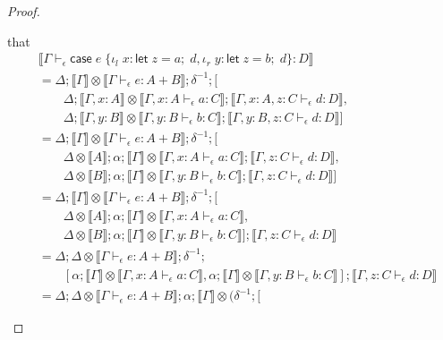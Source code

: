 \documentclass[acmsmall,screen,review]{acmart}
\newcommand{\ms}[1]{\ensuremath{\mathsf{#1}}}
\newcommand{\lto}{:}
\newcommand{\linl}[1]{\iota_l\;{#1}}
\newcommand{\linr}[1]{\iota_r\;{#1}}
\newcommand{\letexpr}[3]{\ensuremath{\ms{let}\;#1 = #2;\;#3}}
\newcommand{\caseexpr}[5]{\ms{case}\;#1\;\{\linl{#2} \lto #3, \linr{#4} \lto #5\}}
\newcommand{\bhyp}[2]{#1 : #2}
\newcommand{\hasty}[4]{#1 \vdash_{#2} #3: {#4}}
\newcommand{\dnt}[1]{\llbracket{#1}\rrbracket}
\begin{document}
\begin{proof}
\begin{itemize}[leftmargin=*]
    that
    \begin{align*}
      & \dnt{\hasty{\Gamma}{\epsilon}{\caseexpr{e}{x}{\letexpr{z}{a}{d}}{y}{\letexpr{z}{b}{d}}}{D}}
      \\ &= \Delta ; \dnt{\Gamma} \otimes \dnt{\hasty{\Gamma}{\epsilon}{e}{A + B}} ; \delta^{-1} ; [
      \\ & \qquad \Delta
            ; \dnt{\Gamma, \bhyp{x}{A}} \otimes \dnt{\hasty{\Gamma, \bhyp{x}{A}}{\epsilon}{a}{C}}
            ; \dnt{\hasty{\Gamma, \bhyp{x}{A}, \bhyp{z}{C}}{\epsilon}{d}{D}}
            ,
      \\  & \qquad \Delta
            ; \dnt{\Gamma, \bhyp{y}{B}} \otimes \dnt{\hasty{\Gamma, \bhyp{y}{B}}{\epsilon}{b}{C}}
            ; \dnt{\hasty{\Gamma, \bhyp{y}{B}, \bhyp{z}{C}}{\epsilon}{d}{D}}
        ]
      \\ &= \Delta ; \dnt{\Gamma} \otimes \dnt{\hasty{\Gamma}{\epsilon}{e}{A + B}} ; \delta^{-1} ; [
      \\ & \qquad \Delta \otimes \dnt{A} ; \alpha
            ; \dnt{\Gamma} \otimes \dnt{\hasty{\Gamma, \bhyp{x}{A}}{\epsilon}{a}{C}}
            ; \dnt{\hasty{\Gamma, \bhyp{z}{C}}{\epsilon}{d}{D}}
            ,
      \\  & \qquad \Delta \otimes \dnt{B} ; \alpha
            ; \dnt{\Gamma} \otimes \dnt{\hasty{\Gamma, \bhyp{y}{B}}{\epsilon}{b}{C}}
            ; \dnt{\hasty{\Gamma, \bhyp{z}{C}}{\epsilon}{d}{D}}
        ]
      \\ &= \Delta ; \dnt{\Gamma} \otimes \dnt{\hasty{\Gamma}{\epsilon}{e}{A + B}} ; \delta^{-1} ; [
      \\ & \qquad \Delta \otimes \dnt{A} ; \alpha
            ; \dnt{\Gamma} \otimes \dnt{\hasty{\Gamma, \bhyp{x}{A}}{\epsilon}{a}{C}}
            ,
      \\  & \qquad \Delta \otimes \dnt{B} ; \alpha
            ; \dnt{\Gamma} \otimes \dnt{\hasty{\Gamma, \bhyp{y}{B}}{\epsilon}{b}{C}}
        ] ; \dnt{\hasty{\Gamma, \bhyp{z}{C}}{\epsilon}{d}{D}}
      \\ &= \Delta ; \Delta \otimes \dnt{\hasty{\Gamma}{\epsilon}{e}{A + B}} ; \delta^{-1} ; 
      \\ & \qquad [
            \alpha ; \dnt{\Gamma} \otimes \dnt{\hasty{\Gamma, \bhyp{x}{A}}{\epsilon}{a}{C}},
            \alpha ; \dnt{\Gamma} \otimes \dnt{\hasty{\Gamma, \bhyp{y}{B}}{\epsilon}{b}{C}}
        ] ; \dnt{\hasty{\Gamma, \bhyp{z}{C}}{\epsilon}{d}{D}}
      \\ &= \Delta ; \Delta \otimes \dnt{\hasty{\Gamma}{\epsilon}{e}{A + B}}  
                   ; \alpha ; \dnt{\Gamma} \otimes (\delta^{-1} ; [

\end{align*}
\end{itemize}
\end{proof}
\end{document}
